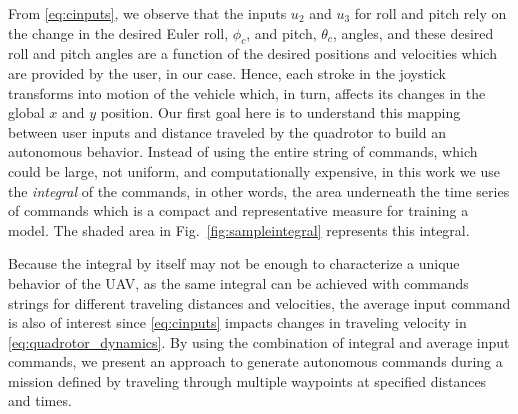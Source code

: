 \documentclass[letterpaper, 10 pt, conference]{ieeeconf}  %
\newcommand\NB[1]{$\spadesuit$\footnote{NB: #1}}
\begin{document}
From \eqref{eq:cinputs}, we observe that the inputs $u_2$ and $u_3$ for roll and pitch rely on the change in the desired Euler roll, $\phi_c$, and pitch, $\theta_c$, angles, and these desired roll and pitch angles are a function of the desired positions and velocities which are provided by the user, in our case. 
Hence, each stroke in the joystick transforms into motion of the vehicle which, in turn, affects its changes in the global $x$ and $y$ position. Our first goal here is to understand this mapping between user inputs and distance traveled by the quadrotor to build an autonomous behavior. Instead of using the entire string of commands, which could be large, not uniform, and computationally expensive, in this work we use the {\em integral} of the commands, in other words, the area underneath the time series of commands which is a compact and representative measure for training a model. The shaded area in Fig.~\ref{fig:sampleintegral} represents this integral. 


Because the integral by itself may not be enough to characterize a unique behavior of the UAV, as the same integral can be achieved with commands strings for different traveling distances and velocities, the average input command is also of interest since \eqref{eq:cinputs} impacts changes in traveling velocity in \eqref{eq:quadrotor_dynamics}. By using the combination of integral and average input commands, we present an approach to generate autonomous commands during a mission defined by traveling through multiple waypoints at specified distances and times.
\end{document}
